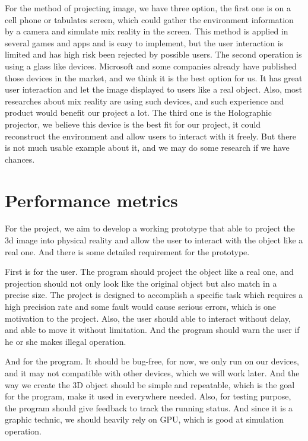\documentclass[10pt,letter paper]{article}
\begin{document}
    For the method of projecting image, we have three option, the first one is on a cell phone or tabulates screen, which could gather the environment information by a camera and simulate mix reality in the screen. This method is applied in several games and apps and is easy to implement, but the user interaction is limited and has high risk been rejected by possible users.  The second operation is using a glass like devices. Microsoft and some companies already have published those devices in the market, and we think it is the best option for us. It has great user interaction and let the image displayed to users like a real object. Also, most researches about mix reality are using such devices, and such experience and product would benefit our project a lot. The third one is the Holographic projector, we believe this device is the best fit for our project, it could reconstruct the environment and allow users to interact with it freely. But there is not much usable example about it, and we may do some research if we have chances.\newline \par


\section*{Performance metrics }
    \bigskip
    For the project, we aim to develop a working prototype that able to project the 3d image into physical reality and allow the user to interact with the object like a real one. And there is some detailed requirement for the prototype.\newline \par
    
    First is for the user. The program should project the object like a real one, and projection should not only look like the original object but also match in a precise size. The project is designed to accomplish a specific task which requires a high precision rate and some fault would cause serious errors, which is one motivation to the project. Also, the user should able to interact without delay, and able to move it without limitation. And the program should warn the user if he or she makes illegal operation.\newline \par
    
    And for the program. It should be bug-free, for now, we only run on our devices, and it may not compatible with other devices, which we will work later. And the way we create the 3D object should be simple and repeatable, which is the goal for the program, make it used in everywhere needed. Also, for testing purpose, the program should give feedback to track the running status. And since it is a graphic technic, we should heavily rely on GPU, which is good at simulation operation.\newline \par
\end{document}
